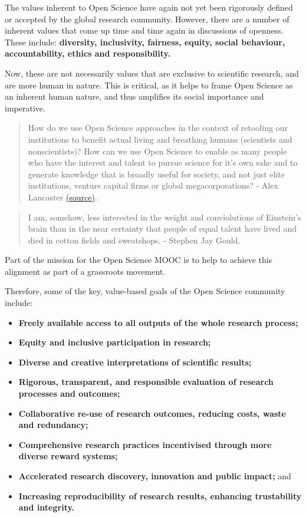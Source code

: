 \documentclass[]{book}
\begin{document}
The values inherent to Open Science have again not yet been rigorously defined or accepted by the global research community. However, there are a number of inherent values that come up time and time again in discussions of openness. These include: \textbf{diversity, inclusivity, fairness, equity, social behaviour, accountability, ethics and responsibility.}

Now, these are not necessarily values that are exclusive to scientific research, and are more human in nature. This is critical, as it helps to frame Open Science as an inherent human nature, and thus amplifies its social importance and imperative.

\begin{quote}
How do we use Open Science approaches in the context of retooling our institutions to benefit actual living and breathing humans (scientists and nonscientists)? How can we use Open Science to enable as many people who have the interest and talent to pursue science for it's own sake and to generate knowledge that is broadly useful for society, and not just elite institutions, venture capital firms or global megacorporations? - Alex Lancaster \href{http://ronininstitute.org/open-science-and-its-discontents/}{(source)}.
\end{quote}

\begin{quote}
I am, somehow, less interested in the weight and conviolutions of Einstein's brain than in the near certainty that people of equal talent have lived and died in cotton fields and sweatshops. - Stephen Jay Gould.
\end{quote}

Part of the mission for the Open Science MOOC is to help to achieve this alignment as part of a grassroots movement.

Therefore, some of the key, value-based goals of the Open Science community include:

\begin{itemize}
\item
  \textbf{Freely available access to all outputs of the whole research process;}
\item
  \textbf{Equity and inclusive participation in research;}
\item
  \textbf{Diverse and creative interpretations of scientific results;}
\item
  \textbf{Rigorous, transparent, and responsible evaluation of research processes and outcomes;}
\item
  \textbf{Collaborative re-use of research outcomes, reducing costs, waste and redundancy;}
\item
  \textbf{Comprehensive research practices incentivised through more diverse reward systems;}
\item
  \textbf{Accelerated research discovery, innovation and public impact;} and
\item
  \textbf{Increasing reproducibility of research results, enhancing trustability and integrity.}
\end{itemize}
\end{document}
